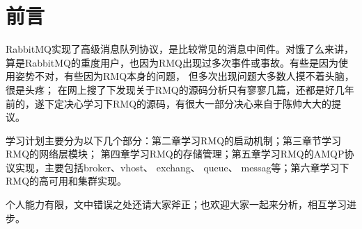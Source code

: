 \chapter{前言}

RabbitMQ实现了高级消息队列协议，是比较常见的消息中间件。对饿了么来讲，算是RabbitMQ的重度用户，也因为RMQ出现过多次事件或事故。有些是因为使用姿势不对，有些因为RMQ本身的问题， 但多次出现问题大多数人摸不着头脑，很是头疼； 在网上搜了下发现关于RMQ的源码分析只有寥寥几篇，还都是好几年前的，遂下定决心学习下RMQ的源码，有很大一部分决心来自于陈帅大大的提议。

学习计划主要分为以下几个部分：第二章学习RMQ的启动机制；第三章节学习RMQ的网络层模块； 第四章学习RMQ的存储管理；第五章学习RMQ的AMQP协议实现，主要包括broker、vhost、 exchang、 queue、 messag等；第六章学习下RMQ的高可用和集群实现。

个人能力有限，文中错误之处还请大家斧正；也欢迎大家一起来分析，相互学习进步。